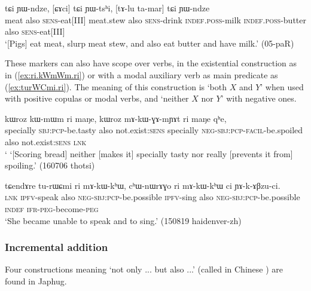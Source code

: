  \begin{exe}
\ex \label{ex:tCi.YWtshi.tCi.YWndze}
\gll [ɕa] tɕi ɲɯ-ndze, [ɕɤci] tɕi ɲɯ-tsʰi, [tɤ-lu ta-mar] tɕi ɲɯ-ndze  \\
meat also \textsc{sens}-eat[III] meat.stew also \textsc{sens}-drink  \textsc{indef}.\textsc{poss}-milk \textsc{indef}.\textsc{poss}-butter also \textsc{sens}-eat[III] \\
\glt  `[Pigs] eat meat, slurp meat stew, and also eat butter and have milk.' (05-paR)
\end{exe}

These markers can also have scope over verbs, in the existential construction as in (\ref{ex:ri.kWmWm.ri}) or with a modal auxiliary verb as main predicate as (\ref{ex:turWCmi.ri}). The meaning of this construction is `both $X$ and $Y$' when used with positive copulas or modal verbs, and `neither $X$ nor $Y$' with negative ones.  

 \begin{exe}
\ex \label{ex:ri.kWmWm.ri}
 \gll   kɯroz kɯ-mɯm ri maŋe, kɯroz mɤ-kɯ-ɣɤ-mɲɤt ri maŋe qʰe, \\
specially \textsc{sbj}:\textsc{pcp}-be.tasty also not.exist:\textsc{sens} specially \textsc{neg}-\textsc{sbj}:\textsc{pcp}-\textsc{facil}-be.spoiled also not.exist:\textsc{sens} \textsc{lnk} \\
 \glt ` `[Scoring bread] neither [makes it] specially tasty nor really [prevents it from] spoiling.'   (160706 thotsi)
  \end{exe}

 \begin{exe}
\ex \label{ex:turWCmi.ri}
 \gll   tɕendɤre tu-rɯɕmi ri mɤ-kɯ-kʰɯ, cʰɯ-nɯrɤɣo ri mɤ-kɯ-kʰɯ ci ɲɤ-k-ɤβzu-ci. \\
 \textsc{lnk} \textsc{ipfv}-speak also \textsc{neg}-\textsc{sbj}:\textsc{pcp}-be.possible  \textsc{ipfv}-sing also \textsc{neg}-\textsc{sbj}:\textsc{pcp}-be.possible  \textsc{indef} \textsc{ifr}-\textsc{peg}-become-\textsc{peg} \\
 \glt `She became unable to speak and to sing.' (150819 haidenver-zh)
 \end{exe}
 
\subsubsection{Incremental addition} \label{sec:incremental.addition}
Four constructions meaning `not only ... but also ...' (called in Chinese ) are found in Japhug.


